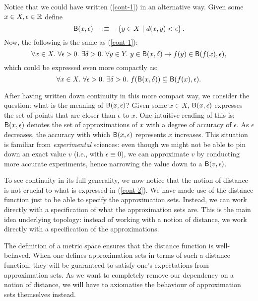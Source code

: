 Notice that we could have written (\ref{cont-1}) in an alternative way. Given
some $x \in X, \epsilon \in \mathbb{R}{}$ define
\begin{equation*}
  \mathsf{B}(x, \epsilon) \quad:\equiv\quad \left\{  y \in X ~|~ d(x, y) < \epsilon  \right\}.
\end{equation*}
Now, the following is the same as (\ref{cont-1}):
\begin{equation*}
  \forall x \in X.~ \forall \epsilon > 0.~ \exists \delta > 0.~ \forall y \in Y.~ y \in \mathsf{B}(x, \delta) \rightarrow f(y) \in \mathsf{B}(f(x), \epsilon),
\end{equation*}
which could be expressed even more compactly as:
\begin{equation}\label{cont-2}
  \forall x \in X.~ \forall \epsilon > 0.~ \exists \delta > 0.~ f(\mathsf{B}(x, \delta)) \subseteq \mathsf{B}(f(x), \epsilon).
\end{equation}

After having written down continuity in this more compact way, we consider the question:
what is the meaning of $\mathsf{B}(x, \epsilon)$? Given some $x \in X$, $\mathsf{B}(x, \epsilon)$ expresses the set
of points that are closer than $\epsilon$ to $x$. One intuitive reading of this is: $\mathsf{B}(x, \epsilon)$
denotes the set of approximations of $x$ with a degree of accuracy of $\epsilon$. As $\epsilon$
decreases, the accuracy with which $\mathsf{B}(x, \epsilon)$ represents $x$ increases. This situation
is familiar from \emph{experimental} sciences: even though we might not be able to pin
down an exact value $v$ (i.e., with $\epsilon \equiv 0$), we can approximate $v$ by conducting more
accurate experiments, hence narrowing the value down to a $\mathsf{B}(v, \epsilon)$.

To see continuity in its full generality, we now notice that the notion of distance is not
crucial to what is expressed in (\ref{cont-2}). We have made use of the distance function
just to be able to specify the approximation sets. Instead, we can work directly with a
specification of what the approximation sets are. This is the main idea underlying
topology: instead of working with a notion of distance, we work directly with a
specification of the approximations.

The definition of a metric space ensures that the distance function is well-behaved. When
one defines approximation sets in terms of such a distance function, they will be
guaranteed to satisfy one's expectations from approximation sets. As we want to completely
remove our dependency on a notion of distance, we will have to axiomatise the behaviour of
approximation sets themselves instead.

